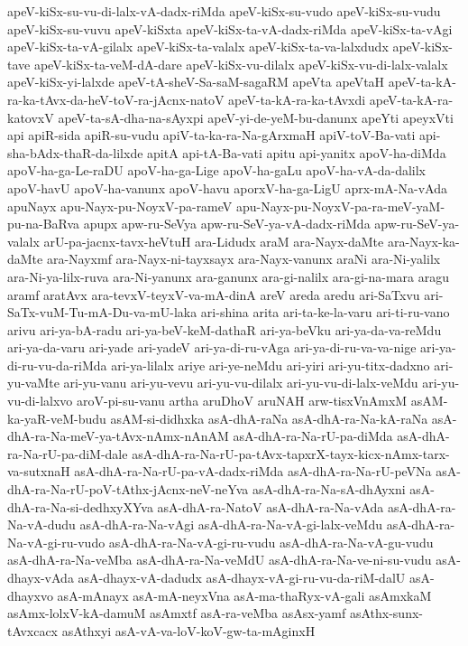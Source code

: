 {apeV-kiSx-su-vu-di-lalx-vA-dadx-riMda
apeV-kiSx-su-vudo
apeV-kiSx-su-vudu
apeV-kiSx-su-vuvu
apeV-kiSxta
apeV-kiSx-ta-vA-dadx-riMda
apeV-kiSx-ta-vAgi
apeV-kiSx-ta-vA-gilalx
apeV-kiSx-ta-valalx
apeV-kiSx-ta-va-lalxdudx
apeV-kiSx-tave
apeV-kiSx-ta-veM-dA-dare
apeV-kiSx-vu-dilalx
apeV-kiSx-vu-di-lalx-valalx
apeV-kiSx-yi-lalxde
apeV-tA-sheV-Sa-saM-sagaRM
apeVta
apeVtaH
apeV-ta-kA-ra-ka-tAvx-da-heV-toV-ra-jAcnx-natoV
apeV-ta-kA-ra-ka-tAvxdi
apeV-ta-kA-ra-katovxV
apeV-ta-sA-dha-na-sAyxpi
apeV-yi-de-yeM-bu-danunx
apeYti
apeyxVti
api
apiR-sida
apiR-su-vudu
apiV-ta-ka-ra-Na-gArxmaH
apiV-toV-Ba-vati
api-sha-bAdx-thaR-da-lilxde
apitA
api-tA-Ba-vati
apitu
api-yanitx
apoV-ha-diMda
apoV-ha-ga-Le-raDU
apoV-ha-ga-Lige
apoV-ha-gaLu
apoV-ha-vA-da-dalilx
apoV-havU
apoV-ha-vanunx
apoV-havu
aporxV-ha-ga-LigU
aprx-mA-Na-vAda
apuNayx
apu-Nayx-pu-NoyxV-pa-rameV
apu-Nayx-pu-NoyxV-pa-ra-meV-yaM-pu-na-BaRva
apupx
apw-ru-SeVya
apw-ru-SeV-ya-vA-dadx-riMda
apw-ru-SeV-ya-valalx
arU-pa-jacnx-tavx-heVtuH
ara-Lidudx
araM
ara-Nayx-daMte
ara-Nayx-ka-daMte
ara-Nayxmf
ara-Nayx-ni-tayxsayx
ara-Nayx-vanunx
araNi
ara-Ni-yalilx
ara-Ni-ya-lilx-ruva
ara-Ni-yanunx
ara-ganunx
ara-gi-nalilx
ara-gi-na-mara
aragu
aramf
aratAvx
ara-tevxV-teyxV-va-mA-dinA
areV
areda
aredu
ari-SaTxvu
ari-SaTx-vuM-Tu-mA-Du-va-mU-laka
ari-shina
arita
ari-ta-ke-la-varu
ari-ti-ru-vano
arivu
ari-ya-bA-radu
ari-ya-beV-keM-dathaR
ari-ya-beVku
ari-ya-da-va-reMdu
ari-ya-da-varu
ari-yade
ari-yadeV
ari-ya-di-ru-vAga
ari-ya-di-ru-va-va-nige
ari-ya-di-ru-vu-da-riMda
ari-ya-lilalx
ariye
ari-ye-neMdu
ari-yiri
ari-yu-titx-dadxno
ari-yu-vaMte
ari-yu-vanu
ari-yu-vevu
ari-yu-vu-dilalx
ari-yu-vu-di-lalx-veMdu
ari-yu-vu-di-lalxvo
aroV-pi-su-vanu
artha
aruDhoV
aruNAH
arw-tisxVnAmxM
asAM-ka-yaR-veM-budu
asAM-si-didhxka
asA-dhA-raNa
asA-dhA-ra-Na-kA-raNa
asA-dhA-ra-Na-meV-ya-tAvx-nAmx-nAnAM
asA-dhA-ra-Na-rU-pa-diMda
asA-dhA-ra-Na-rU-pa-diM-dale
asA-dhA-ra-Na-rU-pa-tAvx-tapxrX-tayx-kicx-nAmx-tarx-va-sutxnaH
asA-dhA-ra-Na-rU-pa-vA-dadx-riMda
asA-dhA-ra-Na-rU-peVNa
asA-dhA-ra-Na-rU-poV-tAthx-jAcnx-neV-neYva
asA-dhA-ra-Na-sA-dhAyxni
asA-dhA-ra-Na-si-dedhxyXYva
asA-dhA-ra-NatoV
asA-dhA-ra-Na-vAda
asA-dhA-ra-Na-vA-dudu
asA-dhA-ra-Na-vAgi
asA-dhA-ra-Na-vA-gi-lalx-veMdu
asA-dhA-ra-Na-vA-gi-ru-vudo
asA-dhA-ra-Na-vA-gi-ru-vudu
asA-dhA-ra-Na-vA-gu-vudu
asA-dhA-ra-Na-veMba
asA-dhA-ra-Na-veMdU
asA-dhA-ra-Na-ve-ni-su-vudu
asA-dhayx-vAda
asA-dhayx-vA-dadudx
asA-dhayx-vA-gi-ru-vu-da-riM-dalU
asA-dhayxvo
asA-mAnayx
asA-mA-neyxVna
asA-ma-thaRyx-vA-gali
asAmxkaM
asAmx-lolxV-kA-damuM
asAmxtf
asA-ra-veMba
asAsx-yamf
asAthx-sunx-tAvxcacx
asAthxyi
asA-vA-va-loV-koV-gw-ta-mAginxH
}
